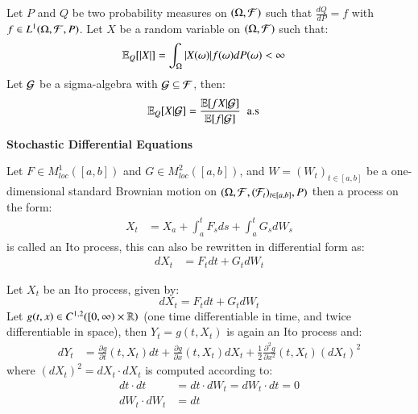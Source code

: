 \begin{theorem}
\label{thm: Bayes_thm}
Let $P$ and $Q$ be two probability measures on $(\Omega, \mathcal{F})$ such that $\frac{dQ}{dP} = f$ with $f\in L^{1}(\Omega, \mathcal{F}, P)$. Let $X$ be a random variable on $(\Omega, \mathcal{F})$ such that: 
\begin{align*}
\mathbb{E}_{Q}[|X|] &= \int_{\Omega}|X(\omega)|f(\omega)dP(\omega) < \infty
\end{align*}
Let $\mathcal{G}$ be a sigma-algebra with $\mathcal{G} \subseteq \mathcal{F}$, then: 
\begin{align*}
\mathbb{E}_{Q}[X|\mathcal{G}] &= 
\frac{
\mathbb{E}[fX|\mathcal{G}]
}{
\mathbb{E}[f|\mathcal{G}]
}\;\; \text{a.s}
\end{align*}
\end{theorem}

\centerline{\textbf{Stochastic Differential Equations}}
\begin{definition}
Let $F\in M^{1}_{loc}([a,b])$  and $G\in M^{2}_{loc}([a,b])$, and $W = (W_{t})_{t\in [a,b]}$ be a one-dimensional standard Brownian motion on $(\Omega,\mathcal{F}, (\mathcal{F}_{t})_{t\in [a,b]},P)$  then a process on the form: 
\begin{align*}
X_{t} &= X_{a} + \int_{a}^{t}F_{s}ds + \int_{a}^{t}G_{s}dW_{s}    
\end{align*}
is called an Ito process, this can also be rewritten in differential form as: 
\begin{align*}
dX_{t} &= F_{t}dt + G_{t}dW_{t}    
\end{align*}
\end{definition} 

\begin{theorem}
\label{thm: Ito's_formula}
Let $X_{t}$ be an Ito process, given by:
$$
dX_{t} = F_{t}dt + G_{t}dW_{t}
$$
Let $g(t,x) \in C^{1,2}([0,\infty) \times \mathbb{R})$ (one time differentiable in time, and twice differentiable in space), then $Y_{t} = g(t,X_{t})$ is again an Ito process and:
\begin{align*}
dY_{t} &= \frac{\partial g}{\partial t}(t,X_{t})dt + 
\frac{\partial g}{\partial x}(t,X_{t})dX_{t} + 
\frac{1}{2}\frac{\partial^{2}g}{\partial x^{2}}(t,X_{t})(dX_{t})^{2}
\end{align*}
where $(dX_{t})^{2} = dX_{t}\cdot dX_{t}$ is computed according to:
\begin{align*}
dt\cdot dt &= dt\cdot dW_{t} = dW_{t}\cdot dt = 0 \\ 
dW_{t}\cdot dW_{t} &= dt
\end{align*}
\end{theorem} 


